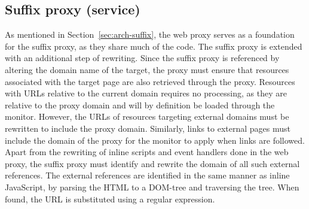 \documentclass{llncs}
\begin{document}
\subsection{Suffix proxy (service)}



%

As mentioned in Section~\ref{sec:arch-suffix}, the web proxy serves as a 
foundation for the suffix proxy, as they share much of the code. The suffix proxy is extended with an additional step of rewriting. 
Since the suffix proxy is referenced by altering the domain name of the target, 
the proxy must ensure that resources associated with the target page are also 
retrieved through the proxy. Resources with URLs relative to the current domain 
requires no processing, as they are relative to the proxy domain and will by 
definition be loaded through the monitor. 
However, the URLs of resources targeting external domains must be rewritten to 
include the proxy domain. Similarly, links to external pages must include the domain of the proxy
for the %
monitor%
to apply 
when links are followed.
Apart from the rewriting of inline 
scripts and event handlers done in the web proxy, the suffix proxy must 
identify and rewrite the domain of all such external references. 
The external references are identified in the same manner as inline JavaScript, 
by parsing the HTML to a DOM-tree and traversing the tree. When found, the 
URL is substituted using a regular expression.%
\end{document}

